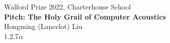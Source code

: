 \makeatletter
    \begin{titlepage}
        \begin{center}
	   {\ \\ \ \\}
        \vbox{}\vspace{5cm}
            {
                \Large Walford Prize 2022, Charterhouse School \\[0.5cm]
                \bf\Large Pitch: The Holy Grail of Computer Acoustics
            } \\ [3cm] 
            {\large Hongming (Lancelot) Liu \\}
            {\large 1.2.7$\alpha$ \\}
        \end{center}
    \end{titlepage}
\makeatother